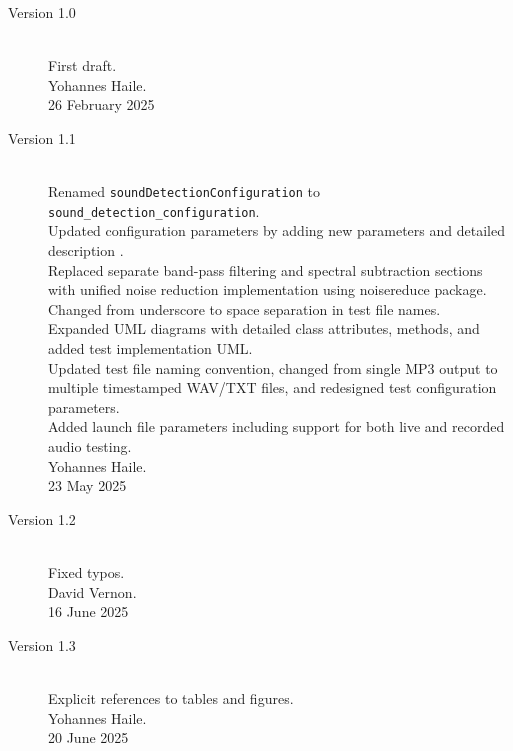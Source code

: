\documentclass{CSSRforAfrica}
\begin{document}
\begin{description}

\item [Version 1.0]~\\
First draft. \\
Yohannes Haile. \\        
26 February 2025   

\item [Version 1.1]~\\
Renamed \texttt{soundDetectionConfiguration} to \texttt{sound\_detection\_configuration}. \\
Updated configuration parameters by adding new parameters and detailed description .\\
Replaced separate band-pass filtering and spectral subtraction sections with unified noise reduction implementation using noisereduce package.\\
Changed from underscore to space separation in test file names.\\
Expanded UML diagrams with detailed class attributes, methods, and added test implementation UML.\\
Updated test file naming convention, changed from single MP3 output to multiple timestamped WAV/TXT files, and redesigned test configuration parameters.\\
Added launch file parameters including support for both live and recorded audio testing.\\
Yohannes Haile. \\
23 May 2025                                          

\item [Version 1.2]~\\
Fixed typos. \\
David Vernon. \\       
16 June 2025   

\item [Version 1.3]~\\
Explicit references to tables and figures. \\
Yohannes Haile. \\       
20 June 2025   

\end{description}
\end{document}
